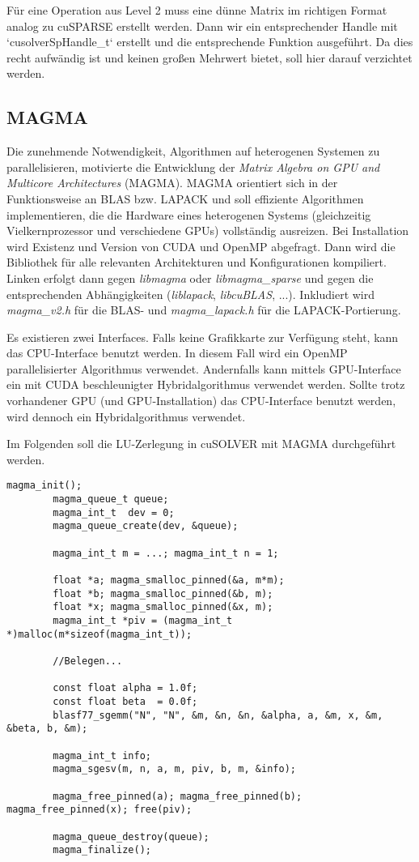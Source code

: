 		Für eine Operation aus Level 2 muss eine dünne Matrix im richtigen Format analog zu cuSPARSE erstellt werden. Dann wir ein entsprechender \Gls{Handle} mit \li`cusolverSpHandle_t` erstellt und die entsprechende Funktion ausgeführt. Da dies recht aufwändig ist und keinen großen Mehrwert bietet, soll hier darauf verzichtet werden.
		
		\subsection{MAGMA}
		Die zunehmende Notwendigkeit, Algorithmen auf heterogenen Systemen zu parallelisieren, motivierte die Entwicklung der \textit{Matrix Algebra on GPU and Multicore Architectures} (MAGMA). MAGMA orientiert sich in der Funktionsweise an BLAS bzw. LAPACK und soll effiziente Algorithmen implementieren, die die Hardware eines heterogenen Systems (gleichzeitig Vielkernprozessor und verschiedene GPUs) vollständig ausreizen. Bei Installation wird Existenz und Version von CUDA und OpenMP abgefragt. Dann wird die Bibliothek für alle relevanten Architekturen und Konfigurationen kompiliert. Linken erfolgt dann gegen \textit{libmagma} oder \textit{libmagma{\_}sparse} und gegen die entsprechenden Abhängigkeiten (\textit{liblapack}, \textit{libcuBLAS}, ...). Inkludiert wird \textit{magma{\_}v2.h} für die BLAS- und \textit{magma{\_}lapack.h} für die LAPACK-Portierung.

		Es existieren zwei Interfaces. Falls keine Grafikkarte zur Verfügung steht, kann das CPU-Interface benutzt werden. In diesem Fall wird ein OpenMP parallelisierter Algorithmus verwendet. Andernfalls kann mittels GPU-Interface ein mit CUDA beschleunigter Hybridalgorithmus verwendet werden. Sollte trotz vorhandener GPU (und GPU-Installation) das CPU-Interface benutzt werden, wird dennoch ein Hybridalgorithmus verwendet.
		
		Im Folgenden soll die LU-Zerlegung in cuSOLVER mit MAGMA durchgeführt werden.
		\begin{lstlisting}[caption=MAGMA: CPU-Interface]
		magma_init();
		magma_queue_t queue;
		magma_int_t  dev = 0;
		magma_queue_create(dev, &queue);
  
		magma_int_t m = ...; magma_int_t n = 1;
                      
		float *a; magma_smalloc_pinned(&a, m*m);   
		float *b; magma_smalloc_pinned(&b, m);  
		float *x; magma_smalloc_pinned(&x, m);   
		magma_int_t *piv = (magma_int_t *)malloc(m*sizeof(magma_int_t));
		
		//Belegen...

		const float alpha = 1.0f;
		const float beta  = 0.0f;
		blasf77_sgemm("N", "N", &m, &n, &n, &alpha, a, &m, x, &m, &beta, b, &m);

		magma_int_t info;
		magma_sgesv(m, n, a, m, piv, b, m, &info);

		magma_free_pinned(a); magma_free_pinned(b); magma_free_pinned(x); free(piv);

		magma_queue_destroy(queue);
		magma_finalize();
		\end{lstlisting}
		
